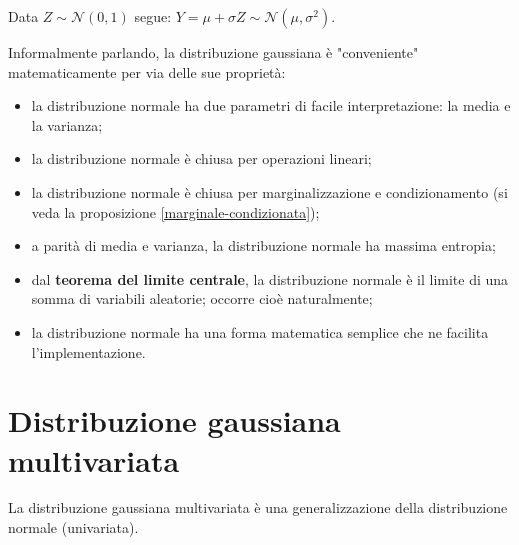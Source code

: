 \begin{oss} \label{normal decomposition}
Data $Z\sim \mathcal{N}(0,1)$ segue:  $Y=\mu + \sigma Z\sim \mathcal{N}(\mu,\sigma^2)$.
\end{oss}

\begin{oss}
Informalmente parlando, la distribuzione gaussiana è "conveniente" matematicamente per via delle sue proprietà:
\begin{itemize}
    \item la distribuzione normale ha due parametri di facile interpretazione: la media e la varianza;
    \item la distribuzione normale è chiusa per operazioni lineari;
    \item la distribuzione normale è chiusa per marginalizzazione e condizionamento (si veda la proposizione \ref{marginale-condizionata});
    \item a parità di media e varianza, la distribuzione normale ha massima entropia;
    \item dal \textbf{teorema del limite centrale}, la distribuzione normale è il limite di una somma di variabili aleatorie; occorre cioè naturalmente;
    \item la distribuzione normale ha una forma matematica semplice che ne facilita l'implementazione.
\end{itemize}
\end{oss}


\newpage


\section{Distribuzione gaussiana multivariata}


La distribuzione gaussiana multivariata è una generalizzazione della distribuzione normale (univariata).



